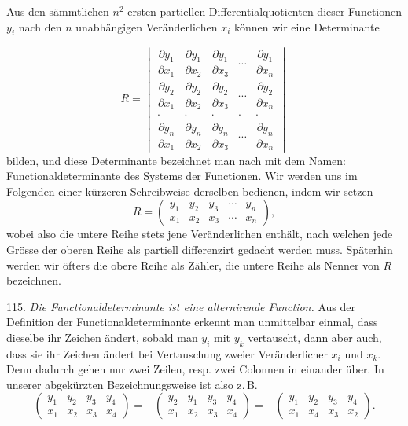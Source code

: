 \documentclass[11pt]{article}
\providecommand{\gesperrt}[1]{\textls[130]{#1}}
\providecommand{\weberpage}[1]{}
\begin{document}
Aus den sämmtlichen $n^2$ ersten partiellen Differentialquotienten dieser Functionen $y_i$ nach den $n$ unabhängigen Veränderlichen $x_i$ können wir eine Determinante


\weberpage{121}
\[
R=\begin{vmatrix}
\dfrac{\partial y_1}{\partial x_1} & \dfrac{\partial y_1}{\partial x_2} & \dfrac{\partial y_1}{\partial x_3} & \cdots & \dfrac{\partial y_1}{\partial x_n}\\[2ex]
\dfrac{\partial y_2}{\partial x_1} & \dfrac{\partial y_2}{\partial x_2} & \dfrac{\partial y_2}{\partial x_3} & \cdots & \dfrac{\partial y_2}{\partial x_n}\\[1.5ex]
\cdot & \cdot & \cdot & \cdot & \cdot\\[1ex]
\dfrac{\partial y_n}{\partial x_1} & \dfrac{\partial y_n}{\partial x_2} & \dfrac{\partial y_n}{\partial x_3} & \cdots & \dfrac{\partial y_n}{\partial x_n}
\end{vmatrix}
\]
bilden, und diese Determinante bezeichnet man nach \gesperrt{Jacobi} mit dem Namen: Functionaldeterminante des Systems der Functionen. Wir werden uns im Folgenden einer kürzeren Schreibweise derselben bedienen, indem wir setzen
\[
R=\begin{pmatrix} y_1 & y_2 & y_3 & \cdots & y_n\\ x_1 & x_2 & x_3 & \cdots & x_n \end{pmatrix},
\]
wobei also die untere Reihe stets jene Veränderlichen enthält, nach welchen jede Grösse der oberen Reihe als partiell differenzirt gedacht werden muss. Späterhin werden wir öfters die obere Reihe als Zähler, die untere Reihe als Nenner von $R$ bezeichnen.

115. \textit{Die Functionaldeterminante ist eine alternirende Function.} Aus der Definition der Functionaldeterminante erkennt man unmittelbar einmal, dass dieselbe ihr Zeichen ändert, sobald man $y_i$ mit $y_k$ vertauscht, dann aber auch, dass sie ihr Zeichen ändert bei Vertauschung zweier Veränderlicher $x_i$ und $x_k$. Denn dadurch gehen nur zwei Zeilen, resp. zwei Colonnen in einander über. In unserer abgekürzten Bezeichnungsweise ist also z.\,B.
\[
\begin{pmatrix} y_1 & y_2 & y_3 & y_4\\ x_1 & x_2 & x_3 & x_4 \end{pmatrix}
=-\begin{pmatrix} y_2 & y_1 & y_3 & y_4\\ x_1 & x_2 & x_3 & x_4 \end{pmatrix}
=-\begin{pmatrix} y_1 & y_2 & y_3 & y_4\\ x_1 & x_4 & x_3 & x_2 \end{pmatrix}.
\]
\end{document}
